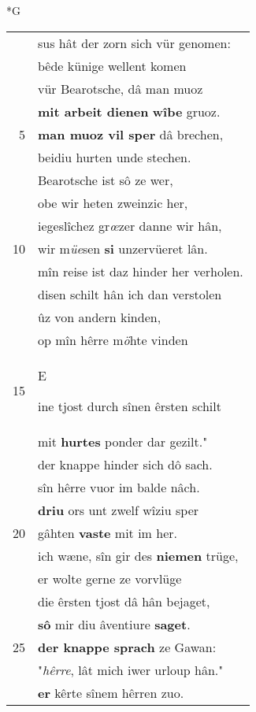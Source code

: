 \documentclass[8pt,a4paper,notitlepage]{article}
\begin{document}
\newpage
\begin{table}[ht]
\begin{minipage}[t]{0.5\linewidth}
\small
\begin{center}*G
\end{center}
\begin{tabular}{rl}
 & sus hât der zorn sich vür genomen:\\ 
 & bêde künige wellent komen\\ 
 & vür Bearotsche, dâ man muoz\\ 
 & \textbf{mit arbeit dienen} \textbf{wîbe} gruoz.\\ 
5 & \textbf{man muoz vil sper} dâ brechen,\\ 
 & beidiu hurten unde stechen.\\ 
 & Bearotsche ist sô ze wer,\\ 
 & obe wir heten zweinzic her,\\ 
 & iegeslîchez gr\textit{œ}zer danne wir hân,\\ 
10 & wir m\textit{üe}sen \textbf{si} unzervüeret lân.\\ 
 & mîn reise ist daz hinder her verholen.\\ 
 & disen schilt hân ich dan verstolen\\ 
 & ûz von andern kinden,\\ 
 & op mîn hêrre m\textit{ö}hte vinden\\ 
15 & \begin{large}E\end{large}ine tjost durch sînen êrsten schilt\\ 
 & mit \textbf{hurtes} ponder dar gezilt."\\ 
 & der knappe hinder sich dô sach.\\ 
 & sîn hêrre vuor im balde nâch.\\ 
 & \textbf{driu} ors unt zwelf wîziu sper\\ 
20 & gâhten \textbf{vaste} mit im her.\\ 
 & ich wæne, sîn gir des \textbf{niemen} trüge,\\ 
 & er wolte gerne ze vorvlüge\\ 
 & die êrsten tjost dâ hân bejaget,\\ 
 & \textbf{sô} mir diu âventiure \textbf{saget}.\\ 
25 & \textbf{der knappe sprach} ze Gawan:\\ 
 & "\textit{hêrre}, lât mich iwer urloup hân."\\ 
 & \textbf{er} kêrte sînem hêrren zuo.\\ 

\end{tabular}
\end{minipage}
\end{table}
\end{document}
